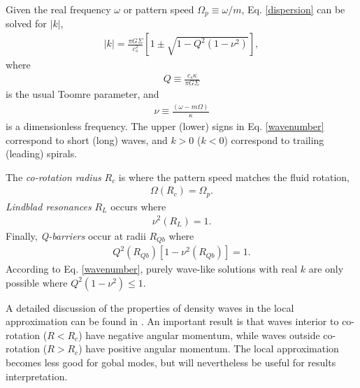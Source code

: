 Given the real frequency $\omega$ or pattern speed $\Omega_p\equiv
\omega/m$, Eq. \ref{dispersion} can be solved 
for $|k|$, 
\begin{align}\label{wavenumber}
  |k| = \frac{\pi G \Sigma}{c_s^2}\left[1 \pm \sqrt{1 -
      Q^2(1-\nu^2)}\right], 
\end{align}
where 
\begin{align}
  Q \equiv \frac{c_s\kappa}{\pi G \Sigma}
\end{align}
is the usual Toomre parameter, and
\begin{align}
  \nu \equiv \frac{(\omega - m\Omega)}{\kappa}
\end{align}
is a dimensionless frequency. The upper (lower) signs in
Eq. \ref{wavenumber} correspond to short (long) waves, and $k>0$
($k<0$) correspond to trailing (leading) spirals.   

The \emph{co-rotation radius} $R_c$ is where the pattern speed matches
the fluid rotation,
\begin{align}
  \Omega(R_c) = \Omega_p.
\end{align}
\emph{Lindblad resonances} $R_L$ occurs where
\begin{align}
  \nu^2(R_L) = 1. 
\end{align}
Finally, \emph{Q-barriers} occur at radii $R_{Qb}$ where
\begin{align}
  Q^2(R_{Qb})\left[1-\nu^2(R_{Qb})\right] = 1.  
\end{align}
According to Eq. \ref{wavenumber}, purely wave-like solutions with
real $k$ are only possible where $Q^2(1-\nu^2)\leq1$.  

A detailed discussion of the properties of density waves in the local
approximation can be found in \cite{shu91}. An important result is that
waves interior to co-rotation ($R<R_c$) have negative angular momentum, while
waves outside co-rotation ($R>R_c$) have positive angular
momentum. The local approximation becomes less good for gobal modes,
but will nevertheless be useful for results interpretation.   